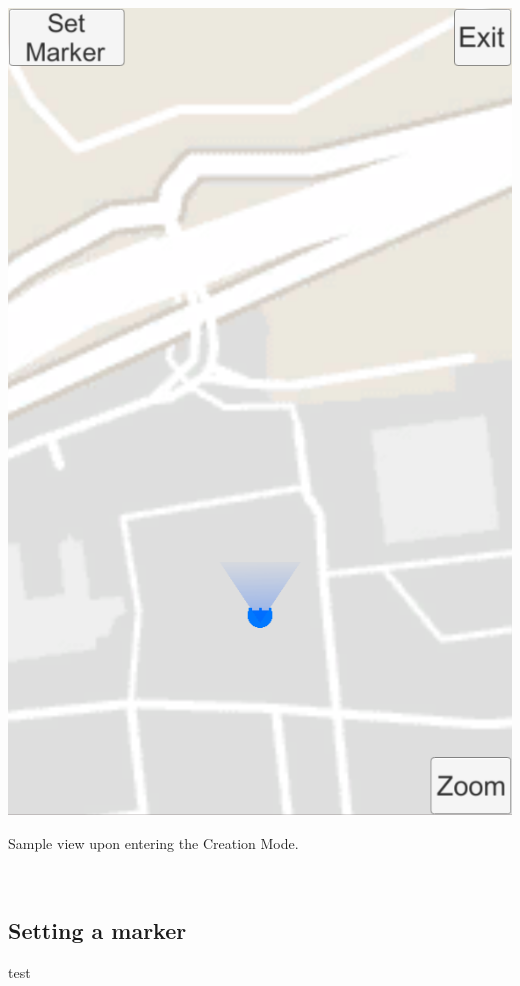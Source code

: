 \documentclass{sigchi-ext}
\begin{document}
\begin{marginfigure}
  \begin{minipage}{\marginparwidth}
    \centering
    \includegraphics[width=0.9\marginparwidth]{figures/CM_Entering}
    \caption{Sample view upon entering the Creation Mode.}~\label{fig:CM_Entering}
  \end{minipage}
\end{marginfigure}
 

\subsection{Setting a marker}

test
\end{document}
